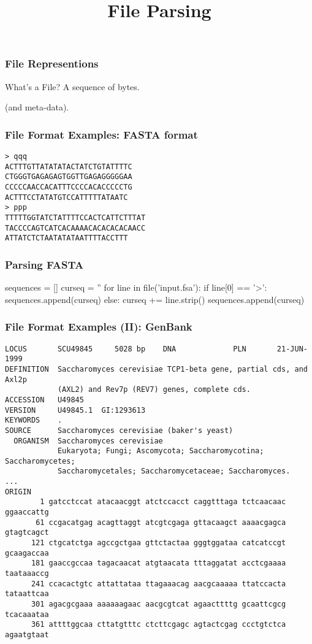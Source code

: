 
\title{File Parsing}

\frame{\maketitle}

\begin{frame}[fragile]
\frametitle{File Representions}
\begin{block}{What's a File?}
A sequence of bytes.

\bigskip
(and meta-data).
\end{block}
\end{frame}

\begin{frame}[fragile]
\frametitle{File Format Examples: FASTA format}
\begin{verbatim}
> qqq
ACTTTGTTATATATACTATCTGTATTTTC
CTGGGTGAGAGAGTGGTTGAGAGGGGGAA
CCCCCAACCACATTTCCCCACACCCCCTG
ACTTTCCTATATGTCCATTTTTATAATC
> ppp
TTTTTGGTATCTATTTTCCACTCATTCTTTAT
TACCCCAGTCATCACAAAACACACACACAACC
ATTATCTCTAATATATAATTTTACCTTT
\end{verbatim}
\end{frame}

\begin{frame}[fragile]
\frametitle{Parsing FASTA}

\begin{python}
sequences = []
curseq = ''
for line in file('input.fsa'):
    if line[0] == '>':
        sequences.append(curseq)
    else:
        curseq += line.strip()
sequences.append(curseq)
\end{python}
\end{frame}

\begin{frame}[fragile]
\frametitle{File Format Examples (II): GenBank}

\begin{verbatim}
LOCUS       SCU49845     5028 bp    DNA             PLN       21-JUN-1999
DEFINITION  Saccharomyces cerevisiae TCP1-beta gene, partial cds, and Axl2p
            (AXL2) and Rev7p (REV7) genes, complete cds.
ACCESSION   U49845
VERSION     U49845.1  GI:1293613
KEYWORDS    .
SOURCE      Saccharomyces cerevisiae (baker's yeast)
  ORGANISM  Saccharomyces cerevisiae
            Eukaryota; Fungi; Ascomycota; Saccharomycotina; Saccharomycetes;
            Saccharomycetales; Saccharomycetaceae; Saccharomyces.
...
ORIGIN
        1 gatcctccat atacaacggt atctccacct caggtttaga tctcaacaac ggaaccattg
       61 ccgacatgag acagttaggt atcgtcgaga gttacaagct aaaacgagca gtagtcagct
      121 ctgcatctga agccgctgaa gttctactaa gggtggataa catcatccgt gcaagaccaa
      181 gaaccgccaa tagacaacat atgtaacata tttaggatat acctcgaaaa taataaaccg
      241 ccacactgtc attattataa ttagaaacag aacgcaaaaa ttatccacta tataattcaa
      301 agacgcgaaa aaaaaagaac aacgcgtcat agaacttttg gcaattcgcg tcacaaataa
      361 attttggcaa cttatgtttc ctcttcgagc agtactcgag ccctgtctca agaatgtaat
\end{verbatim}
\end{frame}

